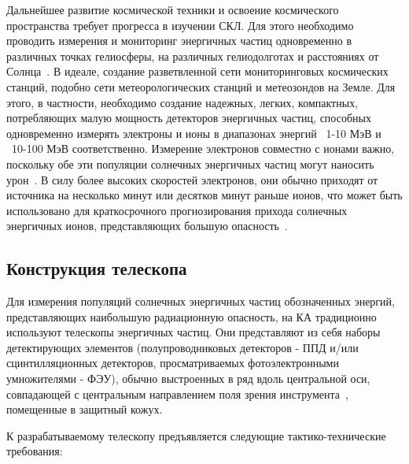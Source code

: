 Дальнейшее развитие космической техники и освоение космического пространства требует прогресса в изучении СКЛ. Для этого необходимо проводить измерения и мониторинг энергичных частиц одновременно в различных точках гелиосферы, на различных гелиодолготах и расстояниях от Солнца~\cite{schrijver2015understanding}. В идеале, создание разветвленной сети мониторинговых космических станций, подобно сети метеорологических станций и метеозондов на Земле. Для этого, в частности, необходимо создание надежных, легких, компактных, потребляющих малую мощность детекторов энергичных частиц, способных одновременно измерять электроны и ионы в диапазонах энергий ~1-10 МэВ и ~10-100 МэВ соответственно. Измерение электронов совместно с ионами важно, поскольку обе эти популяции солнечных энергичных частиц могут наносить урон~\cite{petrukovich2008}. В силу более высоких скоростей электронов, они обычно приходят от источника на несколько минут или десятков минут раньше ионов, что может быть использовано для краткосрочного прогнозирования прихода солнечных энергичных ионов, представляющих большую опасность~\cite{posner2007up}.


 

\subsection{Конструкция телескопа}\label{subsec:detectors/construction}

Для измерения популяций солнечных энергичных частиц обозначенных энергий,
представляющих наибольшую радиационную опасность, на КА традиционно используют
телескопы энергичных частиц. Они представляют из себя наборы детектирующих
элементов (полупроводниковых детекторов - ППД и/или сцинтилляционных детекторов, просматриваемых фотоэлектронными умножителями - ФЭУ), обычно выстроенных в ряд вдоль центральной оси, совпадающей с центральным направлением поля зрения инструмента~\cite{wuest2007calibration,galperin1972}, помещенные в  защитный кожух. 

К разрабатываемому телескопу предъявляется следующие тактико-технические требования:

